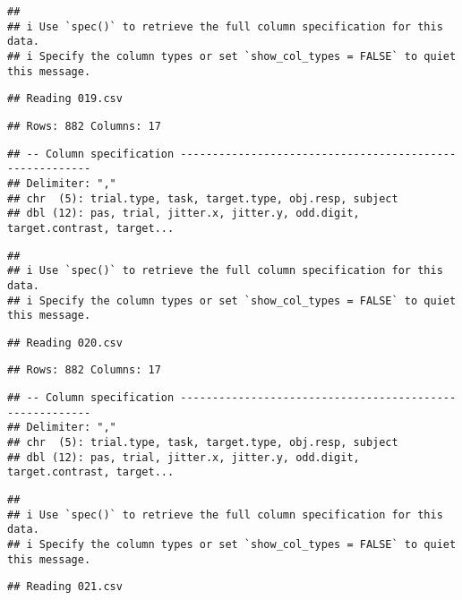 \documentclass[
]{article}
\begin{document}
\begin{verbatim}
## 
## i Use `spec()` to retrieve the full column specification for this data.
## i Specify the column types or set `show_col_types = FALSE` to quiet this message.
\end{verbatim}

\begin{verbatim}
## Reading 019.csv
\end{verbatim}

\begin{verbatim}
## Rows: 882 Columns: 17
\end{verbatim}

\begin{verbatim}
## -- Column specification --------------------------------------------------------
## Delimiter: ","
## chr  (5): trial.type, task, target.type, obj.resp, subject
## dbl (12): pas, trial, jitter.x, jitter.y, odd.digit, target.contrast, target...
\end{verbatim}

\begin{verbatim}
## 
## i Use `spec()` to retrieve the full column specification for this data.
## i Specify the column types or set `show_col_types = FALSE` to quiet this message.
\end{verbatim}

\begin{verbatim}
## Reading 020.csv
\end{verbatim}

\begin{verbatim}
## Rows: 882 Columns: 17
\end{verbatim}

\begin{verbatim}
## -- Column specification --------------------------------------------------------
## Delimiter: ","
## chr  (5): trial.type, task, target.type, obj.resp, subject
## dbl (12): pas, trial, jitter.x, jitter.y, odd.digit, target.contrast, target...
\end{verbatim}

\begin{verbatim}
## 
## i Use `spec()` to retrieve the full column specification for this data.
## i Specify the column types or set `show_col_types = FALSE` to quiet this message.
\end{verbatim}

\begin{verbatim}
## Reading 021.csv
\end{verbatim}
\end{document}
